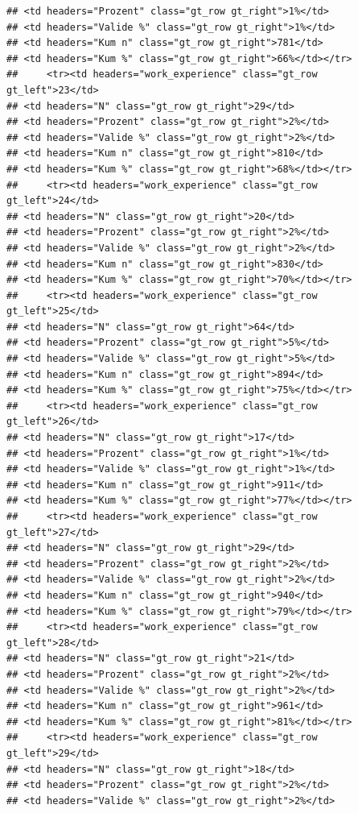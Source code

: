 \documentclass[
  a4paper,
  DIV=11,
  numbers=noendperiod]{scrartcl}
\begin{document}
\begin{verbatim}
## <td headers="Prozent" class="gt_row gt_right">1%</td>
## <td headers="Valide %" class="gt_row gt_right">1%</td>
## <td headers="Kum n" class="gt_row gt_right">781</td>
## <td headers="Kum %" class="gt_row gt_right">66%</td></tr>
##     <tr><td headers="work_experience" class="gt_row gt_left">23</td>
## <td headers="N" class="gt_row gt_right">29</td>
## <td headers="Prozent" class="gt_row gt_right">2%</td>
## <td headers="Valide %" class="gt_row gt_right">2%</td>
## <td headers="Kum n" class="gt_row gt_right">810</td>
## <td headers="Kum %" class="gt_row gt_right">68%</td></tr>
##     <tr><td headers="work_experience" class="gt_row gt_left">24</td>
## <td headers="N" class="gt_row gt_right">20</td>
## <td headers="Prozent" class="gt_row gt_right">2%</td>
## <td headers="Valide %" class="gt_row gt_right">2%</td>
## <td headers="Kum n" class="gt_row gt_right">830</td>
## <td headers="Kum %" class="gt_row gt_right">70%</td></tr>
##     <tr><td headers="work_experience" class="gt_row gt_left">25</td>
## <td headers="N" class="gt_row gt_right">64</td>
## <td headers="Prozent" class="gt_row gt_right">5%</td>
## <td headers="Valide %" class="gt_row gt_right">5%</td>
## <td headers="Kum n" class="gt_row gt_right">894</td>
## <td headers="Kum %" class="gt_row gt_right">75%</td></tr>
##     <tr><td headers="work_experience" class="gt_row gt_left">26</td>
## <td headers="N" class="gt_row gt_right">17</td>
## <td headers="Prozent" class="gt_row gt_right">1%</td>
## <td headers="Valide %" class="gt_row gt_right">1%</td>
## <td headers="Kum n" class="gt_row gt_right">911</td>
## <td headers="Kum %" class="gt_row gt_right">77%</td></tr>
##     <tr><td headers="work_experience" class="gt_row gt_left">27</td>
## <td headers="N" class="gt_row gt_right">29</td>
## <td headers="Prozent" class="gt_row gt_right">2%</td>
## <td headers="Valide %" class="gt_row gt_right">2%</td>
## <td headers="Kum n" class="gt_row gt_right">940</td>
## <td headers="Kum %" class="gt_row gt_right">79%</td></tr>
##     <tr><td headers="work_experience" class="gt_row gt_left">28</td>
## <td headers="N" class="gt_row gt_right">21</td>
## <td headers="Prozent" class="gt_row gt_right">2%</td>
## <td headers="Valide %" class="gt_row gt_right">2%</td>
## <td headers="Kum n" class="gt_row gt_right">961</td>
## <td headers="Kum %" class="gt_row gt_right">81%</td></tr>
##     <tr><td headers="work_experience" class="gt_row gt_left">29</td>
## <td headers="N" class="gt_row gt_right">18</td>
## <td headers="Prozent" class="gt_row gt_right">2%</td>
## <td headers="Valide %" class="gt_row gt_right">2%</td>

\end{verbatim}
\end{document}

